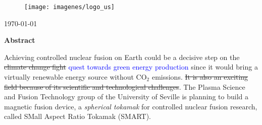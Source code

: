 \documentclass[a4paper,12pt,oneside]{book}
\begin{document}
\begin{center}
%
%
\vfill

\begin{figure}[htbp]
\centering
\texttt{[image: imagenes/logo\_us]}
\end{figure}

\vfill

\today \\

%
%
%
\end{center}
%

\newpage\null
\thispagestyle{empty}

%
\newpage


\begin{center}
\begin{large}
\textbf{Abstract}
\end{large}

\end{center}


Achieving controlled nuclear fusion on Earth could be a decisive step on the \st{climate change fight} \textcolor{blue}{quest towards green energy production} since it would bring a virtually renewable energy source without CO$_2$ emissions. \st{It is also an exciting field because of its scientific and technological challenges}. The Plasma Science and Fusion Technology group of the University of Seville is planning to build a magnetic fusion device, a \textit{spherical tokamak} for controlled nuclear fusion research, called SMall Aspect Ratio Tokamak (SMART).
\end{document}
